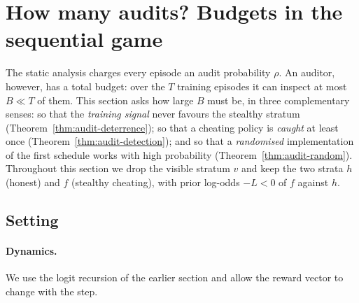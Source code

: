 \section{How many audits? Budgets in the sequential game}
\label{sec:audit-budget}

The static analysis charges every episode an audit probability $\rho$. An
auditor, however, has a total budget: over the $T$ training episodes it can
inspect at most $B\ll T$ of them. This section asks how large $B$ must be, in
three complementary senses: so that the \emph{training signal} never favours
the stealthy stratum (Theorem~\ref{thm:audit-deterrence}); so that a cheating
policy is \emph{caught} at least once
(Theorem~\ref{thm:audit-detection}); and so that a \emph{randomised}
implementation of the first schedule works with high probability
(Theorem~\ref{thm:audit-random}). Throughout this section we drop the visible
stratum $v$ and keep the two strata $h$ (honest) and $f$ (stealthy cheating),
with prior log-odds $-L<0$ of $f$ against $h$.

\subsection{Setting}

\paragraph{Dynamics.} We use the logit recursion of the earlier section and
allow the reward vector to change with the step.

